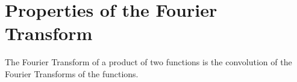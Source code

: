 \documentclass[11pt]{article}
\begin{document}
%
\appendix{}

\section{Properties of the Fourier Transform}

The Fourier Transform of a product of two functions is the convolution of
the Fourier Transforms of the functions.





\printindex{} %
\end{document}
